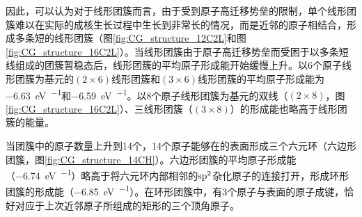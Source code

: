     因此，可以认为对于线形团簇而言，由于受到原子高迁移势垒的限制，单个线形团簇难以在实际的成核生长过程中生长到非常长的情况，而是近邻的原子相结合，形成多条短的线形团簇（图\ref{fig:CG_structure_12C2L}和图\ref{fig:CG_structure_16C2L}）。当线形团簇由于原子高迁移势垒而受困于以多条短线组成的团簇暂稳态后，线形团簇的平均原子形成能开始缓慢上升。以6个原子线形团簇为基元的$\left(2 \times 6\right)$线形团簇和$\left(3 \times 6\right)$线形团簇的平均原子形成能为\SI{-6.63}{\electronvolt\per\atom}和\SI{-6.59}{\electronvolt\per\atom}。以8个原子线形团簇为基元的双线（$\left(2 \times 8\right)$，图\ref{fig:CG_structure_16C2L}）、三线形团簇（$\left(3 \times 8\right)$）的形成能也略高于线形团簇的能量。
    
    当团簇中的原子数量上升到14个，14个原子能够在的表面形成三个六元环（六边形团簇，图\ref{fig:CG_structure_14CH}）。六边形团簇的平均原子形成能（\SI{-6.74}{\electronvolt\per\atom}）略高于将六元环内部相邻的$\rm sp^2$杂化原子的连接打开，形成环形团簇的形成能（\SI{-6.85}{\electronvolt\per\atom}）。在环形团簇中，有3个原子与表面的原子成键，恰好对应于上次近邻原子所组成的矩形的三个顶角原子。

